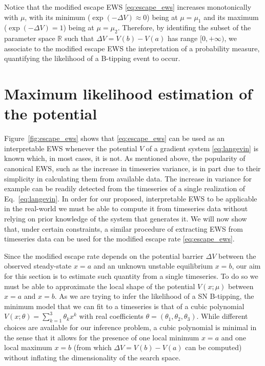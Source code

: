 \documentclass[10pt]{article}
\newcommand{\fref}[1]{Figure~\ref{#1}}
\begin{document}
Notice that the modified escape EWS \eqref{eq:escape_ews} increases monotonically with $\mu$, with its minimum ($\exp(-\Delta V)\approx0$) being at $\mu=\mu_1$ and its maximum ($\exp(-\Delta V)=1$) being at $\mu=\mu_2$.
Therefore, by identifing the subset of the parameter space $\mathbb{R}$ such that $\Delta V = V(b) - V(a)$ has range $[0,+\infty)$, we associate to the modified escape EWS the intepretation of a probability measure, quantifying the likelihood of a B-tipping event to occur.

\section{Maximum likelihood estimation of the potential}\label{sec:mle}
\fref{fig:escape_ews} shows that \eqref{eq:escape_ews} can be used as an interpretable EWS whenever the potential $V$ of a gradient system \eqref{eq:langevin} is known which, in most cases, it is not.
As mentioned above, the popularity of canonical EWS, such as the increase in timeseries variance, is in part due to their simplicity in calculating them from available data.
The increase in variance for example can be readily detected from the timeseries of a single realization of Eq.~\eqref{eq:langevin}.
In order for our proposed, interpretable EWS to be applicable in the real-world we must be able to compute it from timeseries data without relying on prior knowledge of the system that generates it.
We will now show that, under certain constraints, a similar procedure of extracting EWS from timeseries data can be used for the modified escape rate \eqref{eq:escape_ews}.

Since the modified escape rate depends on the potential barrier $\Delta V$ between the observed steady-state $x=a$ and an unknown unstable equilibrium $x=b$, our aim for this section is to estimate such quantity from a single timeseries. 
To do so we must be able to approximate the local shape of the potential $V(x;\mu)$ between $x=a$ and $x=b$.
As we are trying to infer the likelihood of a SN B-tipping, the minimum model that we can fit to a timeseries is that of a cubic polynomial $V(x;\theta) = \sum_{k=1}^{3}\theta_{k}x^{k}$ with real coefficients $\theta=(\theta_{1},\theta_{2},\theta_{3})$.
While different choices are available for our inference problem, a cubic polynomial is minimal in the sense that it allows for the presence of one local minimum $x=a$ and one local maximum $x=b$ (from which $\Delta V = V(b) - V(a)$ can be computed) without inflating the dimensionality of the search space.
\end{document}
